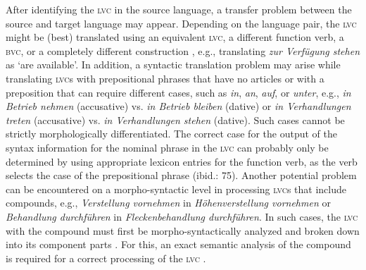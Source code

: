 \documentclass[output=paper]{langsci/langscibook}
\begin{document}
After identifying the \textsc{lvc} in the source language, a transfer problem between the source and target language may appear. Depending on the language pair, the \textsc{lvc} might be (best) translated using an equivalent \textsc{lvc}, a different function verb, a \textsc{bvc}, or a completely different construction \citep[96]{Bruker2013}, e.g., translating \textit{zur Verfügung stehen} as `are available'. In addition, a syntactic translation problem may arise while translating \textsc{lvc}s with prepositional phrases that have no articles or with a preposition that can require different cases, such as \textit{in}, \textit{an}, \textit{auf}, or \textit{unter}, e.g., \textit{in Betrieb nehmen} (accusative) vs. \textit{in Betrieb bleiben} (dative) or \textit{in Verhandlungen treten} (accusative) vs. \textit{in Verhandlungen stehen} (dative). Such cases cannot be strictly morphologically differentiated. The correct case for the output of the syntax information for the nominal phrase in the \textsc{lvc} can probably only be determined by using appropriate lexicon entries for the function verb, as the verb selects the case of the prepositional phrase (ibid.: 75). Another potential problem can be encountered on a morpho-syntactic level in processing \textsc{lvc}s that include compounds, e.g., \textit{Verstellung vornehmen} in \textit{Höhenverstellung vornehmen} or \textit{Behandlung durchführen} in \textit{Fleckenbehandlung durchführen}. In such cases, the \textsc{lvc} with the compound must first be morpho-syntactically analyzed and broken down into its component parts \citep{Winhart2005}. For this, an exact semantic analysis of the compound is required for a correct processing of the \textsc{lvc} \citep[97]{Bruker2013}.
\end{document}
